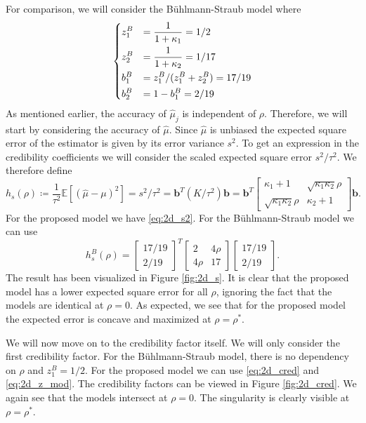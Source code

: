 \documentclass[11pt]{article}
\theoremstyle{definition}
\begin{document}
For comparison, we will consider the Bühlmann-Straub model where
\begin{equation*}
    \begin{dcases}
        z_1^B &= \frac{1}{1+\kappa_1} = 1/2 \\
        z_2^B &= \frac{1}{1+\kappa_2} = 1/17 \\
        b_1^B &= z_1^B/(z_1^B+z_2^B) = 17/19 \\
        b_2^B &= 1-b_1^B = 2/19
    \end{dcases}
\end{equation*}
As mentioned earlier, the accuracy of $\hat\mu_j$ is independent of $\rho$. Therefore, we will start by considering the accuracy of $\hat\mu$. Since $\hat\mu$ is unbiased the expected square error of the estimator is given by its error variance $s^2$. To get an expression in the credibility coefficients we will consider the scaled expected square error $s^2/\tau^2$. We therefore define
\begin{equation}\label{eq:2d_error_s}
    h_s(\rho) \coloneqq \frac{1}{\tau^2}\mathds{E}[(\hat\mu-\mu)^2] = s^2/\tau^2 = \bm b^T \left( K / \tau^2\right) \bm b = \bm b^T\begin{bmatrix}\kappa_1 + 1 & \sqrt{\kappa_1\kappa_2}\rho \\ \sqrt{\kappa_1\kappa_2}\rho &  \kappa_2 + 1   \end{bmatrix}\bm b.
\end{equation}
For the proposed model we have \eqref{eq:2d_s2}. For the Bühlmann-Straub model we can use
\begin{equation*}
    h_s^B(\rho) = \begin{bmatrix} 17/19 \\ 2/19 \end{bmatrix}^T\begin{bmatrix}2 & 4\rho \\ 4\rho &  17   \end{bmatrix}\begin{bmatrix} 17/19 \\ 2/19 \end{bmatrix}.
\end{equation*}
The result has been visualized in Figure \ref{fig:2d_s}. It is clear that the proposed model has a lower expected square error for all $\rho$, ignoring the fact that the models are identical at $\rho=0$. As expected, we see that for the proposed model the expected error is concave and maximized at $\rho=\rho^\ast$.

We will now move on to the credibility factor itself. We will only consider the first credibility factor. For the Bühlmann-Straub model, there is no dependency on $\rho$ and $z_1^B = 1/2$. For the proposed model we can use \eqref{eq:2d_cred} and \eqref{eq:2d_z_mod}. The credibility factors can be viewed in Figure \ref{fig:2d_cred}. We again see that the models intersect at $\rho=0$. The singularity is clearly visible at $\rho=\rho^\ast$.
\end{document}
